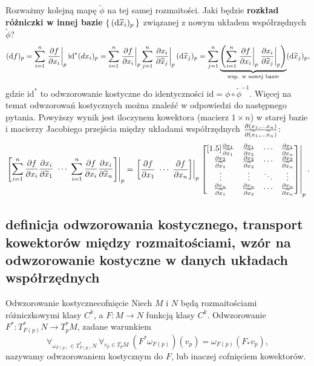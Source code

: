 \documentclass{article}
\newcommand\suni{\sum_{i=1}^{n}}
\newcommand\sunj{\sum_{j=1}^{n}}
\newcommand\at[2]{\left.#1\right|_{#2}}
\newcommand{\id}{\mathrm{id}}
\begin{document}
Rozważmy kolejną mapę $\widetilde{\phi}$ na tej samej rozmaitości. Jaki będzie \textbf{rozkład różniczki w innej bazie} $\set{(\dd{\widetilde{x}_i})_p}$ związanej z nowym układem współrzędnych $\widetilde{\phi}$? 
\[
  (\dd{f})_p = \suni \at{\pdv{f}{x_i}}{p} \id^*(dx_i)_p = \suni \at{\pdv{f}{x_i}}{p} \sunj \at{\pdv{x_i}{\widetilde{x}_j}}{p} (\dd{\widetilde{x}_j})_p = 
  \sunj \underbrace{\left(\suni \at{\pdv{f}{x_i}}{p} \at{\pdv{x_i}{\widetilde{x}_j}}{p}\right)}_{\text{wsp. w nowej bazie}} (\dd{\widetilde{x}_j})_p,
\]
gdzie $\id^*$ to odwzorowanie kostyczne do identyczności $\id=\phi\circ\widetilde{\phi}^{-1}$. Więcej na temat odwzorowań kostycznych można znaleźć w odpowiedzi do następnego pytania. Powyższy wynik jest iloczynem kowektora (macierz $1\times n$) w starej bazie i macierzy Jacobiego przejścia między układami współrzędnych $\pdv{(x_1,\ldots x_n)}{(\widetilde{x}_1,\ldots \widetilde{x}_n)}$:
\[
\at{\mqty[\displaystyle\suni \pdv{f}{x_i} \pdv{x_i}{\widetilde{x}_1}\ \cdots\ \suni \pdv{f}{x_i} \pdv{x_i}{\widetilde{x}_n}]}{p} = \at{\mqty[\displaystyle\pdv{f}{x_1}\ \cdots\ \pdv{f}{x_n}]}{p}
 \at{\begin{bmatrix}[1.5]
   \pdv{x_1}{\widetilde{x}_1} & \pdv{x_1}{\widetilde{x}_2} & \cdots & \pdv{x_1}{\widetilde{x}_n} \\
   \pdv{x_2}{\widetilde{x}_1} & \pdv{x_2}{\widetilde{x}_2} & \cdots & \pdv{x_2}{\widetilde{x}_n} \\
   \vdots  & \vdots  & \ddots & \vdots  \\
   \pdv{x_n}{\widetilde{x}_1} & \pdv{x_n}{\widetilde{x}_2} & \cdots & \pdv{x_n}{\widetilde{x}_n}
 \end{bmatrix}}{p}.
\]









\subsection{definicja odwzorowania kostycznego, transport kowektorów między rozmaitościami, wzór na odwzorowanie kostyczne w danych układach współrzędnych} \label{sec:cofnięcie}

\begin{dfn}{Odwzorowanie kostyczne}{cofnięcie}
  Niech $M$ i $N$ będą rozmaitościami różniczkowymi klasy $C^k$, a $F:M\to N$ funkcją klasy $C^k$. Odwzorowanie $F^*: T^*_{F(p)}N\to T^*_p M$, zadane warunkiem
  \[
  \forall_{\omega_{F(p)}\in T^*_{F(p)}N}\, \forall_{v_{p}\in T_p M}\ 
  \left( F^*\omega_{F(p)} \right)(v_p) = \omega_{F(p)}\left( F_* v_p \right),
  \]
  nazywamy odwzorowaniem kostycznym do $F$, lub inaczej cofnięciem kowektorów.
\end{dfn}
\end{document}
